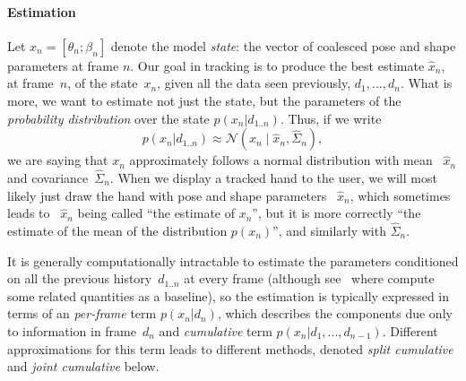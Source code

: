 \paragraph{Estimation}
Let $x_n = [\theta_n; \beta_n]$ denote the model {\em state}: the vector of coalesced pose and shape parameters at frame $n$.  
Our goal in tracking is to produce the best estimate $\hat{x}_n$, at frame~$n$, of the state~$x_n$, given all the data seen previously, $d_1, ..., d_n$.
What is more, we want to estimate not just the state, but the parameters of the {\em probability distribution} over the state $p(x_n|d_{1..n})$.  Thus, if we write
\begin{equation}
p(x_n|d_{1..n}) \approx \mathcal N(x_n \mid \hat{x}_n, \hat{\Sigma}_n),
\end{equation}
we are saying that $x_n$ approximately follows a normal distribution with mean ~$\hat x_n$ and covariance~$\hat\Sigma_n$.  When we display a tracked hand to the user, we will most likely just draw the hand with pose and shape parameters~ $\hat x_n$, which sometimes leads to ~$\hat x_n$ being called ``the estimate of $x_n$'', but it is more correctly ``the estimate of the mean of the distribution $p(x_n)$'', and similarly with $\hat\Sigma_n$.

It is generally computationally intractable to estimate the parameters conditioned on all the previous history~$d_{1..n}$ at every frame (although see~ where compute some related quantities as a baseline), so the estimation is typically expressed in terms of an {\em per-frame} term $p(x_n|d_n)$, which describes the components due only to information in frame~$d_n$ and {\em cumulative} term $p(x_n|d_1, ..., d_{n-1})$.  Different approximations for this term leads to different methods, denoted {\em split cumulative} and {\em joint cumulative} below.




